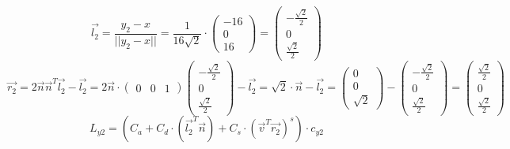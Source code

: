 \documentclass{article}
\begin{document}
\[
\overrightarrow{l_2}=\frac{y_2-x}{||y_2-x||}=\frac{1}{16\sqrt{2}}\cdot
\begin{pmatrix}
-16\\0\\16
\end{pmatrix}=
\begin{pmatrix}
-\frac{\sqrt{2}}{2}\\0\\ \frac{\sqrt{2}}{2}
\end{pmatrix}
\]
\[
\overrightarrow{r_2}=2\overrightarrow{n}\overrightarrow{n}^T\overrightarrow{l_2}-\overrightarrow{l_2}=
2\overrightarrow{n}\cdot
\begin{pmatrix}
0&0&1
\end{pmatrix}
\begin{pmatrix}
-\frac{\sqrt{2}}{2}\\0\\ \frac{\sqrt{2}}{2}
\end{pmatrix}-\overrightarrow{l_2}=\sqrt{2}\cdot \overrightarrow{n}-\overrightarrow{l_2} =
\begin{pmatrix}
0\\0 \\ \sqrt{2}
\end{pmatrix}-
\begin{pmatrix}
- \frac{\sqrt{2}}{2}\\0\\ \frac{\sqrt{2}}{2}
\end{pmatrix}=
\begin{pmatrix}
 \frac{\sqrt{2}}{2}\\ 0\\ \frac{\sqrt{2}}{2}
\end{pmatrix}
\]
\[
L_{y2} = (C_a + C_d\cdot(\overrightarrow{l_2}^T\overrightarrow{n})+C_s\cdot(\overrightarrow{v}^T\overrightarrow{r_2})^s)\cdot c_{y2}
\]
\end{document}

